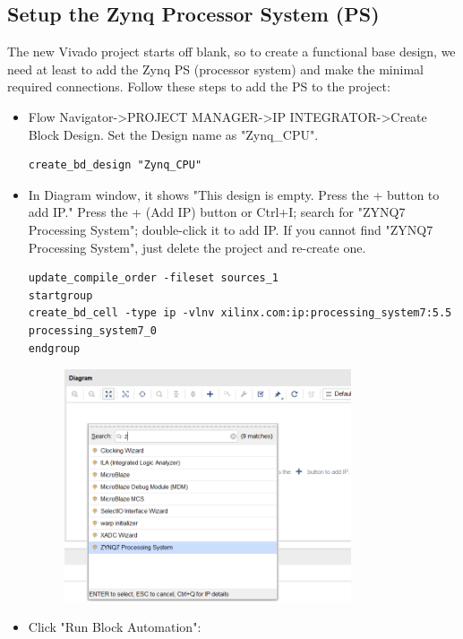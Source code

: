 \documentclass[a4paper,12pt,twoside]{article}
\begin{document}
\subsection{Setup the Zynq Processor System (PS)}
The new Vivado project starts off blank, so to create a functional base design, we need at least to add the Zynq PS (processor system) and make the minimal required connections. Follow these steps to add the PS to the project:
\begin{itemize}
    \item Flow Navigator->PROJECT MANAGER->IP INTEGRATOR->Create Block Design. Set the Design name as "Zynq\_CPU".
    \begin{verbatim}
create_bd_design "Zynq_CPU"
    \end{verbatim}
    \item In Diagram window, it shows "This design is empty. Press the + button to add IP." Press the + (Add IP) button or Ctrl+I; search for "ZYNQ7 Processing System"; double-click it to add IP. If you cannot find "ZYNQ7 Processing System", just delete the project and re-create one.
    \begin{verbatim}
update_compile_order -fileset sources_1
startgroup
create_bd_cell -type ip -vlnv xilinx.com:ip:processing_system7:5.5 processing_system7_0
endgroup
    \end{verbatim}
    \begin{figure}[H]
        \centering
        \includegraphics[width=0.8\textwidth]{images/2.png}
    \end{figure}
    \item Click "Run Block Automation":
    \begin{verbatim}

\end{verbatim}
\end{itemize}
\end{document}
